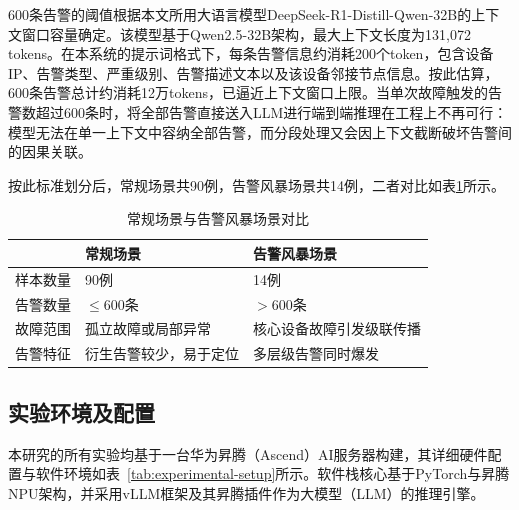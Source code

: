 600条告警的阈值根据本文所用大语言模型DeepSeek-R1-Distill-Qwen-32B的上下文窗口容量确定。该模型基于Qwen2.5-32B架构，最大上下文长度为131,072 tokens。在本系统的提示词格式下，每条告警信息约消耗200个token，包含设备IP、告警类型、严重级别、告警描述文本以及该设备邻接节点信息。按此估算，600条告警总计约消耗12万tokens，已逼近上下文窗口上限。当单次故障触发的告警数超过600条时，将全部告警直接送入LLM进行端到端推理在工程上不再可行：模型无法在单一上下文中容纳全部告警，而分段处理又会因上下文截断破坏告警间的因果关联。

按此标准划分后，常规场景共90例，告警风暴场景共14例，二者对比如表\ref{tab:scenario_compare}所示。

\begin{table}[H]
\centering
\caption{常规场景与告警风暴场景对比}
\label{tab:scenario_compare}
\begin{tabular}{p{2.2cm}p{5.2cm}p{5.2cm}}
\toprule
 & \textbf{常规场景} & \textbf{告警风暴场景} \\
\midrule
样本数量 & 90例 & 14例\\
\hline
告警数量 & $\leq 600$条 & $> 600$条\\
\hline
故障范围 & 孤立故障或局部异常 & 核心设备故障引发级联传播\\
\hline
告警特征 & 衍生告警较少，易于定位 & 多层级告警同时爆发\\
\bottomrule
\end{tabular}
\end{table}


\subsection{实验环境及配置}

本研究的所有实验均基于一台华为昇腾（Ascend）AI服务器构建，其详细硬件配置与软件环境如表~\ref{tab:experimental-setup}所示。软件栈核心基于PyTorch与昇腾NPU架构，并采用vLLM框架及其昇腾插件作为大模型（LLM）的推理引擎。

